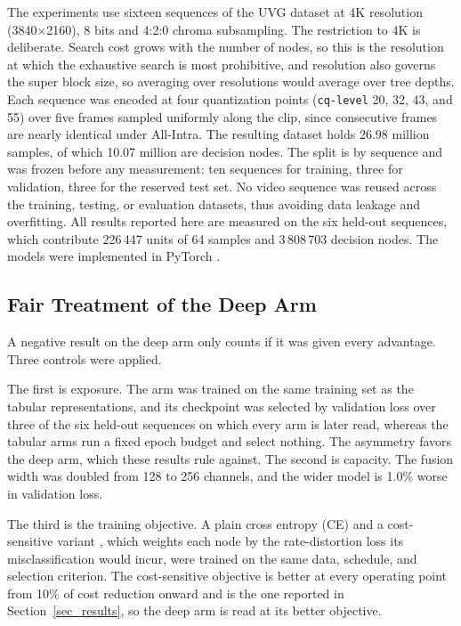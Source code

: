 \documentclass[conference]{IEEEtran}
\begin{document}
The experiments use sixteen sequences of the UVG dataset \cite{uvg} at 4K
resolution (3840$\times$2160), 8 bits and 4:2:0 chroma subsampling. The
restriction to 4K is deliberate. Search cost grows with the number of nodes, so
this is the resolution at which the exhaustive search is most prohibitive, and
resolution also governs the super block size, so averaging over resolutions
would average over tree depths. Each sequence was encoded at four quantization
points (\texttt{cq-level} 20, 32, 43, and 55) over five frames sampled uniformly
along the clip, since consecutive frames are nearly identical under All-Intra.
The resulting dataset holds 26.98 million samples, of which 10.07 million are
decision nodes. The split is by sequence and was frozen before any measurement:
ten sequences for training, three for validation, three for the reserved test
set. No video sequence was reused across the training, testing, or evaluation
datasets, thus avoiding data leakage and overfitting. All results reported here
are measured on the six held-out sequences, which contribute 226\,447 units of
64 samples and 3\,808\,703 decision nodes. The models were implemented in
PyTorch \cite{pytorch}.

\subsection{Fair Treatment of the Deep Arm}

A negative result on the deep arm only counts if it was given every advantage.
Three controls were applied.

The first is exposure. The arm was trained on the same training set as the
tabular representations, and its checkpoint was selected by validation loss over
three of the six held-out sequences on which every arm is later read, whereas
the tabular arms run a fixed epoch budget and select nothing. The asymmetry
favors the deep arm, which these results rule against. The second is capacity.
The fusion width was doubled from 128 to 256 channels, and the wider model is
1.0\% worse in validation loss.

The third is the training objective. A plain cross entropy (CE) and a
cost-sensitive variant \cite{elkan}, which weights each node by the
rate-distortion loss its misclassification would incur, were trained on the same
data, schedule, and selection criterion. The cost-sensitive objective is better
at every operating point from 10\% of cost reduction onward and is the one
reported in Section~\ref{sec_results}, so the deep arm is read at its better
objective.
\end{document}
